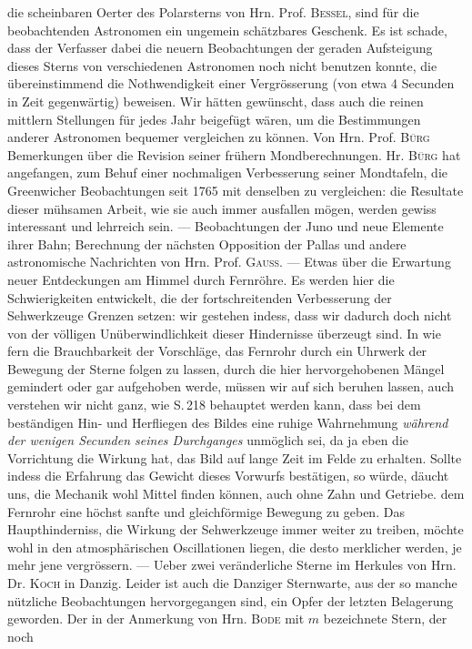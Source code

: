 die scheinbaren Oerter des Polarsterns von Hrn. Prof. \textsc{Bessel}, sind für die beobachtenden Astronomen
ein ungemein schätzbares Geschenk. Es ist schade, dass der Verfasser dabei die neuern Beobachtungen
der geraden Aufsteigung dieses Sterns von verschiedenen Astronomen noch nicht benutzen konnte, die
übereinstimmend die Nothwendigkeit einer Vergrösserung (von etwa 4 Secunden in Zeit gegenwärtig)
beweisen. Wir hätten gewünscht, dass auch die reinen mittlern Stellungen für jedes Jahr beigefügt
wären, um die Bestimmungen anderer Astronomen bequemer vergleichen zu können. Von Hrn. Prof.
\textsc{Bürg} Bemerkungen über die Revision seiner frühern Mondberechnungen. Hr. \textsc{Bürg} hat angefangen, zum
Behuf einer nochmaligen Verbesserung seiner Mondtafeln, die Greenwicher Beobachtungen seit 1765
mit denselben zu vergleichen: die Resultate dieser mühsamen Arbeit, wie sie auch immer ausfallen
mögen, werden gewiss interessant und lehrreich sein. --- Beobachtungen der Juno und neue Elemente
ihrer Bahn; Berechnung der nächsten Opposition der Pallas und andere astronomische Nachrichten von
Hrn. Prof. \textsc{Gauss}. --- Etwas über die Erwartung neuer Entdeckungen am Himmel durch Fernröhre. Es
werden hier die Schwierigkeiten entwickelt, die der fortschreitenden Verbesserung der Sehwerkzeuge
Grenzen setzen: wir gestehen indess, dass wir dadurch doch nicht von der völligen Unüberwindlichkeit
dieser Hindernisse überzeugt sind. In wie fern die Brauchbarkeit der Vorschläge, das Fernrohr durch
ein Uhrwerk der Bewegung der Sterne folgen zu lassen, durch die hier hervorgehobenen Mängel gemindert oder gar aufgehoben werde, müssen wir auf sich beruhen lassen, auch verstehen wir nicht ganz,
wie S.\,218 behauptet werden kann, dass bei dem beständigen Hin- und Herfliegen des Bildes eine ruhige Wahrnehmung \emph{während der wenigen Secunden seines Durchganges} unmöglich sei, da ja eben die
Vorrichtung die Wirkung hat, das Bild auf lange Zeit im Felde zu erhalten. Sollte indess die Erfahrung das Gewicht dieses Vorwurfs bestätigen, so würde, däucht uns, die Mechanik wohl Mittel finden
können, auch ohne Zahn und Getriebe. dem Fernrohr eine höchst sanfte und gleichförmige Bewegung
zu geben. Das Haupthinderniss, die Wirkung der Sehwerkzeuge immer weiter zu treiben, möchte wohl
in den atmosphärischen Oscillationen liegen, die desto merklicher werden, je mehr jene vergrössern. ---
Ueber zwei veränderliche Sterne im Herkules von Hrn. Dr. \textsc{Koch} in Danzig. Leider ist auch die Danziger Sternwarte, aus der so manche nützliche Beobachtungen hervorgegangen sind, ein Opfer der letzten Belagerung geworden. Der in der Anmerkung von Hrn. \textsc{Bode} mit $m$ bezeichnete Stern, der noch

